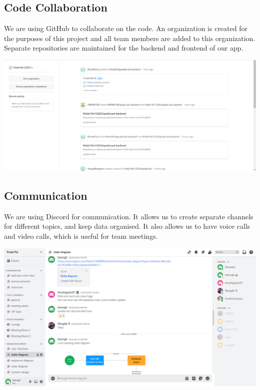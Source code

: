 \documentclass[11pt]{article}
\begin{document}
\subsection{Code Collaboration}
We are using GitHub to collaborate on the code. An organization is created for the purposes of this project and all team members are added to this organization. Separate repositories are maintained for the backend and frontend of our app. 
\begin{center}
  \includegraphics[scale=0.3]{project-plan-images/github.png}
\end{center}

\subsection{Communication}
We are using Discord for communication. It allows us to create separate channels for different topics, and keep data organised. It also allows us to have voice calls and video calls, which is useful for team meetings.
\begin{center}
  \includegraphics[scale=0.3]{project-plan-images/communication.png}
\end{center}

\end{document}
